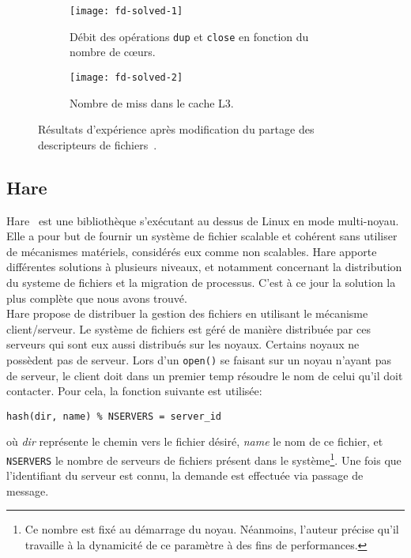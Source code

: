       \begin{figure}[ht]
        \begin{subfigure}[b]{0.5\textwidth}
          \texttt{[image: fd-solved-1]}
          \caption{Débit des opérations \texttt{dup} et \texttt{close} en
            fonction du nombre de c\oe urs.}
          \label{fig:fd-solved-1}
        \end{subfigure}
        \begin{subfigure}[b]{0.5\textwidth}
          \texttt{[image: fd-solved-2]}
          \caption{Nombre de miss dans le cache L3.}
          \label{fig:fd-solved-2}
        \end{subfigure}
        \caption{Résultats d'expérience après modification du partage des
          descripteurs de fichiers~\citep{boyd2008corey}.}
      \end{figure}
      \FloatBarrier


    \subsection{Hare}

      Hare~\citep{gruenwald2014providing} est une bibliothèque s'exécutant au
      dessus de Linux en mode multi-noyau. Elle a pour but de fournir un système
      de fichier scalable et cohérent sans utiliser de mécanismes matériels,
      considérés eux comme non scalables. Hare apporte différentes solutions à
      plusieurs niveaux, et notamment concernant la distribution du systeme de
      fichiers et la migration de processus. C'est à ce jour la solution la plus
      complète que nous avons trouvé.\\

      Hare propose de distribuer la gestion des fichiers en utilisant le
      mécanisme client/serveur. Le système de fichiers est géré de manière
      distribuée par ces serveurs qui sont eux aussi distribués sur les
      noyaux. Certains noyaux ne possèdent pas de serveur. Lors d'un
      \texttt{open()} se faisant sur un noyau n'ayant pas de serveur, le client
      doit dans un premier temp résoudre le nom de celui qu'il doit
      contacter. Pour cela, la fonction suivante est utilisée:
      \begin{center}
        \texttt{hash(dir, name) \% NSERVERS = server\_id}
      \end{center}
      où \textit{dir} représente le chemin vers le fichier désiré, \textit{name}
      le nom de ce fichier, et \texttt{NSERVERS} le nombre de serveurs de
      fichiers présent dans le système\footnote{Ce nombre est fixé au démarrage
        du noyau. Néanmoins, l'auteur précise qu'il travaille à la dynamicité de
        ce paramètre à des fins de performances.}. Une fois que l'identifiant du
      serveur est connu, la demande est effectuée via passage de message.

